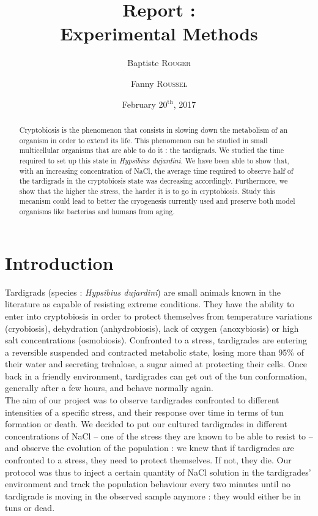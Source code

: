 \documentclass[12pt,a4paper, twocolumn]{article}
\author{Baptiste \textsc{Rouger} \and Fanny \textsc{Roussel}}
\title{Report :\\Experimental Methods}
\date{February 20$^{\text{th}}$, 2017}
\begin{document}
\maketitle

\begin{abstract}
Cryptobiosis is the phenomenon that consists in slowing down the metabolism of an organism in order to extend its life. This phenomenon can be studied in small multicellular organisms that are able to do it : the tardigrads. We studied the time required to set up this state in \textit{Hypsibius dujardini}. We have been able to show that, with an increasing concentration of NaCl, the average time required to observe half of the tardigrads in the cryptobiosis state was decreasing accordingly. Furthermore, we show that the higher the stress, the harder it is to go in cryptobiosis. Study this mecanism could lead to better the cryogenesis currently used and preserve both model organisms like bacterias and humans from aging.
\end{abstract}


\section{Introduction}
Tardigrads (species : \textit{Hypsibius dujardini}) are small animals known in the literature as capable of resisting extreme conditions. They have the ability to enter into cryptobiosis in order to protect themselves from temperature variations (cryobiosis), dehydration (anhydrobiosis), lack of oxygen (anoxybiosis) or high salt concentrations (osmobiosis). Confronted to a stress, tardigrades are entering a reversible suspended  and contracted metabolic state, losing more than 95\% of their water and secreting trehalose, a sugar aimed at protecting their cells. Once back in a friendly environment, tardigrades can get out of the tun conformation, generally after a few hours, and behave normally again.\\
The aim of our project was to observe tardigrades confronted to different intensities of a specific stress, and their response over time in terms of tun formation or death. We decided to put our cultured tardigrades in different concentrations of NaCl – one of the stress they are known to be able to resist to – and observe the evolution of the population : we knew that if tardigrades are confronted to a stress, they need to protect themselves. If not, they die. Our protocol was thus to inject a certain quantity of NaCl solution in the tardigrades’ environment and track the population behaviour every two minutes until no tardigrade is moving in the observed sample anymore : they would either be in tuns or dead.\\
 
\end{document}

